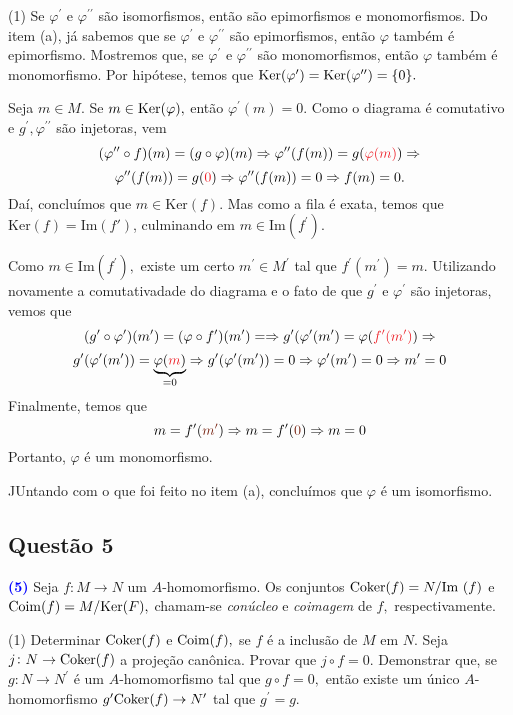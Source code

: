 \documentclass[11pt,a4paper]{article}
\newcommand{\questao}[1]{\subsection{Questão #1} \textcolor{blue}{\bf(#1)}}
\newcommand{\dividiritens}[1]{\begin{tasks}[counter-format={(tsk[a])},label-width=3.6ex, label-format = {\bfseries}, column-sep = {0pt}](1) #1 \end{tasks}}
\newcommand{\pers}[1]{\textcolor{Floresta}{$\negrito{(#1)} $}}
\begin{document}
\dividiritens{
\task[\pers{b}] Se $\varphi^{\prime}$ e $\varphi^{\prime \prime}$ são isomorfismos, então são epimorfismos e monomorfismos. Do item (a), já sabemos que se $\varphi^{\prime}$ e $\varphi^{\prime \prime}$ são epimorfismos, então $\varphi$ também é epimorfismo. Mostremos que, se $\varphi^{\prime}$ e $\varphi^{\prime \prime}$ são monomorfismos, então $\varphi$ também é monomorfismo.
Por hipótese, temos que ${\rm Ker}(\varphi^{\prime}) = {\rm Ker}(\varphi^{\prime \prime}) = \{ 0\}.$ 

Seja $m \in M.$ Se $m \in {\rm Ker}(\varphi),$ então $\varphi^{\prime}(m) = 0.$ Como o diagrama é comutativo e $g^{\prime}, \varphi^{\prime \prime}$ são injetoras, vem
\[
(\varphi^{\prime \prime} \circ f)(m) = (g \circ \varphi)(m) \Rightarrow \varphi^{\prime \prime}(f(m)) = g(\textcolor{Red}{\varphi(m)}) \Rightarrow\]\[ \varphi^{\prime \prime}(f(m)) = g(\textcolor{Red}{0})  \Rightarrow \varphi^{\prime \prime}(f(m)) = 0 \Rightarrow f(m) = 0.
\]
Daí, concluímos que $m \in \mathrm{Ker}(f).$ Mas como a fila é exata, temos que $\mathrm{Ker}(f)=\mathrm{Im}(f')$, culminando em $m \in \mbox{Im}(f^{\prime}).$ 

Como $m \in \mbox{Im}(f^{\prime}),$ existe um certo $m^{\prime} \in M^{\prime}$ tal que $f^{\prime}(m^{\prime}) = m.$ Utilizando novamente a comutativadade do diagrama e o fato de que $g^{\prime}$ e $\varphi^{\prime}$ são injetoras, vemos que
\[
(g^{\prime} \circ \varphi^{\prime})(m^{\prime}) = (\varphi \circ f^{\prime})(m^{\prime}) =  \Rightarrow g^{\prime} (\varphi^{\prime}(m^{\prime})  = \varphi(\textcolor{Red}{f^{\prime}(m^{\prime})}) \Rightarrow \]\[ g^{\prime} (\varphi^{\prime}(m^{\prime}))  = \underbrace{\varphi(\textcolor{Red}{m}) }_{=0} \Rightarrow g^{\prime} (\varphi^{\prime}(m^{\prime}))  = 0 \Rightarrow \varphi^{\prime}(m^{\prime}) = 0 \Rightarrow m^{\prime} = 0
\]
Finalmente, temos que 
\[m = f^{\prime}(\textcolor{Brown}{m^{\prime}}) \Rightarrow m = f^{\prime}(\textcolor{Brown}{0}) \Rightarrow m = 0
\]
Portanto, $\varphi$ é um monomorfismo.

JUntando com o que foi feito no item (a), concluímos que $\varphi$ é um isomorfismo.
}

\questao{5} Seja $f \colon M \to N$ um $A$-homomorfismo. Os conjuntos ${\rm Coker}(f) = N/\mbox{Im }(f)$ e ${\rm Coim}(f) = M/{\rm Ker}(F),$ chamam-se \emph{conúcleo} e \emph{coimagem} de $f,$ respectivamente.
\dividiritens{
\task[\pers{a}] Determinar ${\rm Coker}(f)$ e ${\rm Coim}(f),$ se $f$ é a inclusão de $M$ em $N.$
\task[\pers{b}] Seja $j \colon N \to {\rm Coker}(f)$ a projeção canônica. Provar que $j \circ f = 0.$ Demonstrar que, se $g \colon N \to N^{\prime}$ é um $A$-homomorfismo tal que $g \circ f = 0,$ então existe um único $A$-homomorfismo $g^{\prime} {\rm Coker}(f) \to N^{\prime}$ tal que $g^{\prime} = g.$
}
\end{document}
